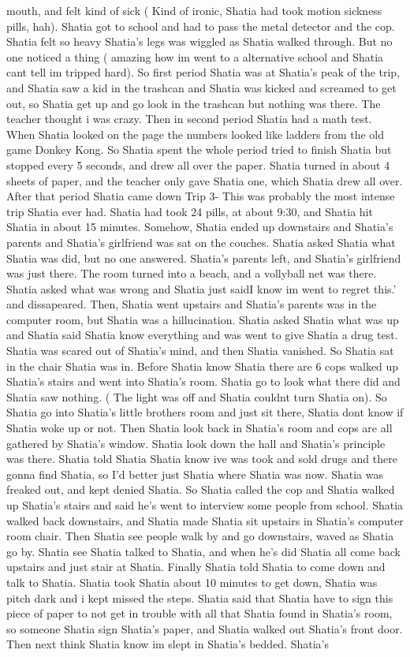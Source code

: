 \documentclass[12pt]{book}
\begin{document}
mouth, and felt kind of sick ( Kind of ironic, Shatia had took motion sickness pills, hah). Shatia got to school and had to pass the metal detector and the cop. Shatia felt so heavy Shatia's legs was wiggled as Shatia walked through. But no one noticed a thing ( amazing how im went to a alternative school and Shatia cant tell im tripped hard). So first period Shatia was at Shatia's peak of the trip, and Shatia saw a kid in the trashcan and Shatia was kicked and screamed to get out, so Shatia get up and go look in the trashcan but nothing was there. The teacher thought i was crazy. Then in second period Shatia had a math test. When Shatia looked on the page the numbers looked like ladders from the old game Donkey Kong. So Shatia spent the whole period tried to finish Shatia but stopped every 5 seconds, and drew all over the paper. Shatia turned in about 4 sheets of paper, and the teacher only gave Shatia one, which Shatia drew all over. After that period Shatia came down Trip 3- This was probably the most intense trip Shatia ever had. Shatia had took 24 pills, at about 9:30, and Shatia hit Shatia in about 15 minutes. Somehow, Shatia ended up downstairs and Shatia's parents and Shatia's girlfriend was sat on the couches. Shatia asked Shatia what Shatia was did, but no one answered. Shatia's parents left, and Shatia's girlfriend was just there. The room turned into a beach, and a vollyball net was there. Shatia asked what was wrong and Shatia just saidI know im went to regret this.' and dissapeared. Then, Shatia went upstairs and Shatia's parents was in the computer room, but Shatia was a hillucination. Shatia asked Shatia what was up and Shatia said Shatia know everything and was went to give Shatia a drug test. Shatia was scared out of Shatia's mind, and then Shatia vanished. So Shatia sat in the chair Shatia was in. Before Shatia know Shatia there are 6 cops walked up Shatia's stairs and went into Shatia's room. Shatia go to look what there did and Shatia saw nothing. ( The light was off and Shatia couldnt turn Shatia on). So Shatia go into Shatia's little brothers room and just sit there, Shatia dont know if Shatia woke up or not. Then Shatia look back in Shatia's room and cops are all gathered by Shatia's window. Shatia look down the hall and Shatia's principle was there. Shatia told Shatia Shatia know ive was took and sold drugs and there gonna find Shatia, so I'd better just Shatia where Shatia was now. Shatia was freaked out, and kept denied Shatia. So Shatia called the cop and Shatia walked up Shatia's stairs and said he's went to interview some people from school. Shatia walked back downstairs, and Shatia made Shatia sit upstairs in Shatia's computer room chair. Then Shatia see people walk by and go downstairs, waved as Shatia go by. Shatia see Shatia talked to Shatia, and when he's did Shatia all come back upstairs and just stair at Shatia. Finally Shatia told Shatia to come down and talk to Shatia. Shatia took Shatia about 10 minutes to get down, Shatia was pitch dark and i kept missed the steps. Shatia said that Shatia have to sign this piece of paper to not get in trouble with all that Shatia found in Shatia's room, so someone Shatia sign Shatia's paper, and Shatia walked out Shatia's front door. Then next think Shatia know im slept in Shatia's bedded. Shatia's 
\end{document}

